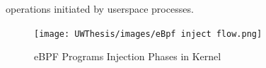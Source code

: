 \documentclass [11pt, proquest] {uwthesis}[2020/02/24]
\begin{document}
operations initiated by userspace processes.


\label{sec:ebpf-inject-flow}
\begin{figure}[h]
\texttt{[image: UWThesis/images/eBpf inject flow.png]}
\caption{eBPF Programs Injection Phases in Kernel}
\label{fig:eBPF-injection}
\end{figure}

\newpage
\end{document}
